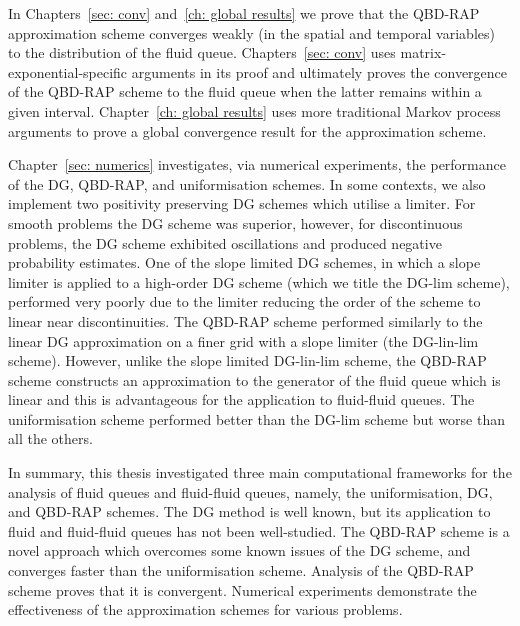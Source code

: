 In Chapters~\ref{sec: conv} and~\ref{ch: global results} we prove that the QBD-RAP approximation scheme converges weakly (in the spatial and temporal variables) to the distribution of the fluid queue. Chapters~\ref{sec: conv} uses matrix-exponential-specific arguments in its proof and ultimately proves the convergence of the QBD-RAP scheme to the fluid queue when the latter remains within a given interval. Chapter~\ref{ch: global results} uses more traditional Markov process arguments to prove a global convergence result for the approximation scheme. 

Chapter~\ref{sec: numerics} investigates, via numerical experiments, the performance of the DG, QBD-RAP, and uniformisation schemes. In some contexts, we also implement two positivity preserving DG schemes which utilise a limiter. For smooth problems the DG scheme was superior, however, for discontinuous problems, the DG scheme exhibited oscillations and produced negative probability estimates. One of the slope limited DG schemes, in which a slope limiter is applied to a high-order DG scheme (which we title the DG-lim scheme), performed very poorly due to the limiter reducing the order of the scheme to linear near discontinuities. The QBD-RAP scheme performed similarly to the linear DG approximation on a finer grid with a slope limiter (the DG-lin-lim scheme). %
However, unlike the slope limited DG-lin-lim scheme, the QBD-RAP scheme constructs an approximation to the generator of the fluid queue which is linear and this is advantageous for the application to fluid-fluid queues. The uniformisation scheme performed better than the DG-lim scheme but worse than all the others. 

In summary, this thesis investigated three main computational frameworks for the analysis of fluid queues and fluid-fluid queues, namely, the uniformisation, DG, and QBD-RAP schemes. The DG method is well known, but its application to fluid and fluid-fluid queues has not been well-studied. The QBD-RAP scheme is a novel approach which overcomes some known issues of the DG scheme, and converges faster than the uniformisation scheme. Analysis of the QBD-RAP scheme proves that it is convergent. Numerical experiments demonstrate the effectiveness of the approximation schemes for various problems. 